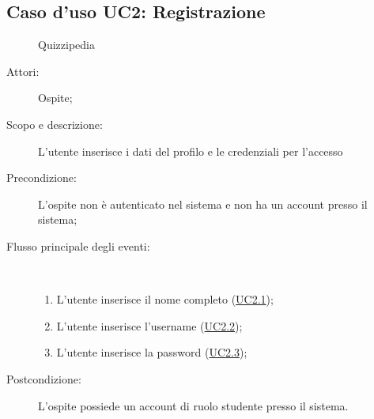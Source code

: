 \subsection{Caso d'uso UC2: Registrazione}
	\begin{figure}[H]
		\centering
		\begin{resizedtikzpicture}{\textwidth}
		\begin{umlsystem}[x=0, fill=lightgray!20]{Quizzipedia}
		\end{umlsystem}
		\end{resizedtikzpicture}
		\caption{}
	\end{figure}
\begin{description}
\item[Attori:] Ospite;
\item[Scopo e descrizione:] L'utente inserisce i dati del profilo e le credenziali per l'accesso
      \item[Precondizione:] L'ospite non è autenticato nel sistema e non ha un account presso il sistema;

        \item[Flusso principale degli eventi:] \ 
 \begin{enumerate}
          \item L'utente inserisce il nome completo (\hyperlink{UC2.1}{UC2.1});
          \item L'utente inserisce l'username (\hyperlink{UC2.2}{UC2.2});
          \item L'utente inserisce la password (\hyperlink{UC2.3}{UC2.3});

      \end{enumerate}
    \item[Postcondizione:] L’ospite possiede un account di ruolo studente presso il sistema.
  \end{description}
\hypertarget{UC2.1}{}
